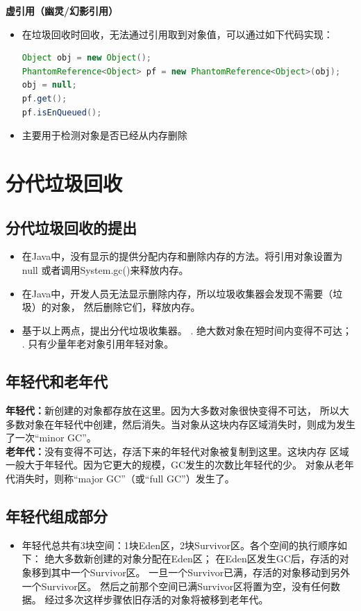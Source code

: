 \textbf{虚引用（幽灵/幻影引用）}
\begin{itemize}
	\item 在垃圾回收时回收，无法通过引用取到对象值，可以通过如下代码实现：
	\begin{lstlisting}[language=java]
Object obj = new Object();
PhantomReference<Object> pf = new PhantomReference<Object>(obj);
obj = null;
pf.get();
pf.isEnQueued();
	\end{lstlisting}
	\item 主要用于检测对象是否已经从内存删除
\end{itemize}

\section{分代垃圾回收}
\subsection{分代垃圾回收的提出}
\begin{itemize}
	\item 在Java中，没有显示的提供分配内存和删除内存的方法。将引用对象设置为null
	或者调用System.gc()来释放内存。
	\item 在Java中，开发人员无法显示删除内存，所以垃圾收集器会发现不需要（垃圾）的对象，
	然后删除它们，释放内存。
	\item 基于以上两点，提出分代垃圾收集器。
	. 绝大数对象在短时间内变得不可达；
	. 只有少量年老对象引用年轻对象。
\end{itemize}
\subsection{年轻代和老年代}
\noindent \textbf{年轻代：}新创建的对象都存放在这里。因为大多数对象很快变得不可达，
所以大多数对象在年轻代中创建，然后消失。当对象从这块内存区域消失时，则成为发生了一次“minor GC”。
\\ \textbf{老年代：}没有变得不可达，存活下来的年轻代对象被复制到这里。这块内存
区域一般大于年轻代。因为它更大的规模，GC发生的次数比年轻代的少。
对象从老年代消失时，则称“major GC”（或“full GC”）发生了。
\subsection{年轻代组成部分}
\begin{itemize}
	\item 年轻代总共有3块空间：1块Eden区，2块Survivor区。各个空间的执行顺序如下：
	\subitem 绝大多数新创建的对象分配在Eden区；
	\subitem 在Eden区发生GC后，存活的对象移到其中一个Survivor区。
	\subitem 一旦一个Survivor已满，存活的对象移动到另外一个Survivor区。
	然后之前那个空间已满Survivor区将置为空，没有任何数据。
	\subitem 经过多次这样步骤依旧存活的对象将被移到老年代。
\end{itemize}
